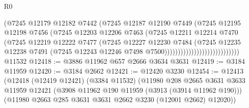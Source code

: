 \begin{lexlean}{R0}
\begin{coremodule}
                                          (@7245
                                            @12179
                                            @12182
                                            @7442
                                            (@7245
                                              @12187
                                              @12190
                                              @7449
                                              (@7245
                                                @12195
                                                @12198
                                                @7456
                                                (@7245
                                                  @12203
                                                  @12206
                                                  @7463
                                                  (@7245
                                                    @12211
                                                    @12214
                                                    @7470
                                                    (@7245
                                                      @12219
                                                      @12222
                                                      @7477
                                                      (@7245
                                                        @12227
                                                        @12230
                                                        @7484
                                                        (@7245
                                                          @12235
                                                          @12238
                                                          @7491
                                                          (@7245
                                                            @12243
                                                            @12246
                                                            @7498
                                                            @7500))))))))))))))))))))))))))))
    @11532
@12418 := @3886 @11962 @657 @2666 @3634 @3631
@12419 := @3184 @11959
@12420 := @3184 @2662
@12421 := @12420 @3230
@12454 := @12413
    (@12418
      (@12419 @12421)
      (@3384 @11532)
      (@11980
        @208
        @2665
        @3631
        @3633
        @11959
        @12421
        (@3908 @11962 @190 @11959 (@3913 (@3914 @11962 @190)))
        (@11980 @2663 @285 @3631 @3631 @2662 @3230 (@12001 @2662) @12020))

\end{coremodule}
\end{lexlean}

